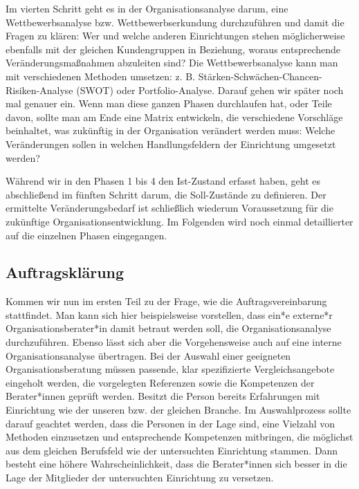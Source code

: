 \documentclass[
  letterpaper,
]{book}
\begin{document}
Im vierten Schritt geht es in der Organisationsanalyse darum, eine
Wettbewerbsanalyse bzw. Wettbewerbserkundung durchzuführen und damit die
Fragen zu klären: Wer und welche anderen Einrichtungen stehen
möglicherweise ebenfalls mit der gleichen Kundengruppen in Beziehung,
woraus entsprechende Veränderungsmaßnahmen abzuleiten sind? Die
Wettbewerbsanalyse kann man mit verschiedenen Methoden umsetzen: z. B.
Stärken-Schwächen-Chancen-Risiken-Analyse (SWOT) oder Portfolio-Analyse.
Darauf gehen wir später noch mal genauer ein. Wenn man diese ganzen
Phasen durchlaufen hat, oder Teile davon, sollte man am Ende eine Matrix
entwickeln, die verschiedene Vorschläge beinhaltet, was zukünftig in der
Organisation verändert werden muss: Welche Veränderungen sollen in
welchen Handlungsfeldern der Einrichtung umgesetzt werden?

Während wir in den Phasen 1 bis 4 den Ist-Zustand erfasst haben, geht es
abschließend im fünften Schritt darum, die Soll-Zustände zu definieren.
Der ermittelte Veränderungsbedarf ist schließlich wiederum Voraussetzung
für die zukünftige Organisationsentwicklung. Im Folgenden wird noch
einmal detaillierter auf die einzelnen Phasen eingegangen.

\subsection{Auftragsklärung}\label{auftragskluxe4rung}

Kommen wir nun im ersten Teil zu der Frage, wie die Auftragsvereinbarung
stattfindet. Man kann sich hier beispielsweise vorstellen, dass ein*e
externe*r Organisationsberater*in damit betraut werden soll, die
Organisationsanalyse durchzuführen. Ebenso lässt sich aber die
Vorgehensweise auch auf eine interne Organisationsanalyse übertragen.
Bei der Auswahl einer geeigneten Organisationsberatung müssen passende,
klar spezifizierte Vergleichsangebote eingeholt werden, die vorgelegten
Referenzen sowie die Kompetenzen der Berater*innen geprüft werden.
Besitzt die Person bereits Erfahrungen mit Einrichtung wie der unseren
bzw. der gleichen Branche. Im Auswahlprozess sollte darauf geachtet
werden, dass die Personen in der Lage sind, eine Vielzahl von Methoden
einzusetzen und entsprechende Kompetenzen mitbringen, die möglichst aus
dem gleichen Berufsfeld wie der untersuchten Einrichtung stammen. Dann
besteht eine höhere Wahrscheinlichkeit, dass die Berater*innen sich
besser in die Lage der Mitglieder der untersuchten Einrichtung zu
versetzen.
\end{document}
